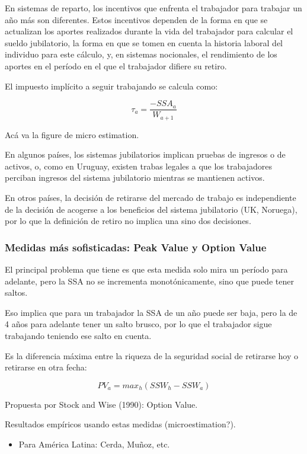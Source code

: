 \documentclass[]{article}
\providecommand{\tightlist}{%
  \setlength{\itemsep}{0pt}\setlength{\parskip}{0pt}}
\begin{document}
En sistemas de reparto, los incentivos que enfrenta el trabajador para
trabajar un año más son diferentes. Estos incentivos dependen de la
forma en que se actualizan los aportes realizados durante la vida del
trabajador para calcular el sueldo jubilatorio, la forma en que se tomen
en cuenta la historia laboral del individuo para este cálculo, y, en
sistemas nocionales, el rendimiento de los aportes en el período en el
que el trabajador difiere su retiro.

El impuesto implícito a seguir trabajando se calcula como:

\[ \tau_{a} = \frac{-SSA_{a}}{W_{a+1}} \]

Acá va la figure de micro estimation.

En algunos países, los sistemas jubilatorios implican pruebas de
ingresos o de activos, o, como en Uruguay, existen trabas legales a que
los trabajadores perciban ingresos del sistema jubilatorio mientras se
mantienen activos.

En otros países, la decisión de retirarse del mercado de trabajo es
independiente de la decisión de acogerse a los beneficios del sistema
jubilatorio (UK, Noruega), por lo que la definición de retiro no implica
una sino dos decisiones.

\subsubsection{Medidas más sofisticadas: Peak Value y Option
Value}\label{medidas-mas-sofisticadas-peak-value-y-option-value}

El principal problema que tiene es que esta medida solo mira un período
para adelante, pero la SSA no se incrementa monotónicamente, sino que
puede tener saltos.

Eso implica que para un trabajador la SSA de un año puede ser baja, pero
la de 4 años para adelante tener un salto brusco, por lo que el
trabajador sigue trabajando teniendo ese salto en cuenta.

Es la diferencia máxima entre la riqueza de la seguridad social de
retirarse hoy o retirarse en otra fecha:

\[ PV_{a} = max_{h}(SSW_{h}-SSW_{a}) \]

Propuesta por Stock and Wise (1990): Option Value.

Resultados empíricos usando estas medidas (microestimation?).

\begin{itemize}
\tightlist
\item
  Para América Latina: Cerda, Muñoz, etc.
\end{itemize}
\end{document}
